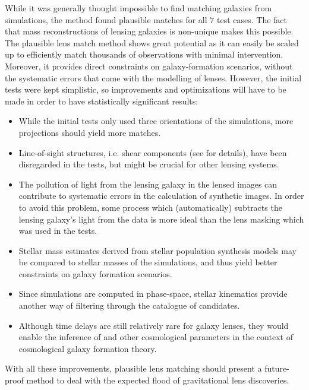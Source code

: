 While it was generally thought impossible to find matching galaxies from
simulations, the method found plausible matches for all 7 test cases.  The fact
that mass reconstructions of lensing galaxies is non-unique makes this possible.
The plausible lens match method shows great potential as it can easily be scaled
up to efficiently match thousands of observations with minimal intervention.
Moreover, it provides direct constraints on galaxy-formation scenarios, without
the systematic errors that come with the modelling of lenses.  However, the
initial tests were kept simplistic, so improvements and optimizations will have
to be made in order to have statistically significant results:
\begin{itemize}
    \item While the initial tests only used three orientations of the
    simulations, more projections should yield more matches.
    \item Line-of-sight structures, i.e. shear components (see 
    for details), have been disregarded in the tests, but might be crucial for
    other lensing systems.
    \item The pollution of light from the lensing galaxy in the lensed images
    can contribute to systematic errors in the calculation of synthetic images.
    In order to avoid this problem, some process which (automatically) subtracts
    the lensing galaxy's light from the data is more ideal than the lens masking
    which was used in the tests.
    \item Stellar mass estimates derived from stellar population synthesis
    models may be compared to stellar masses of the simulations, and thus yield
    better constraints on galaxy formation scenarios.
    \item Since simulations are computed in phase-space, stellar kinematics
    provide another way of filtering through the catalogue of candidates.
    \item Although time delays are still relatively rare for galaxy lenses, they
    would enable the inference of \Ho{} and other cosmological parameters in the
    context of cosmological galaxy formation theory.
\end{itemize}
With all these improvements, plausible lens matching should present a
future-proof method to deal with the expected flood of gravitational lens
discoveries.
